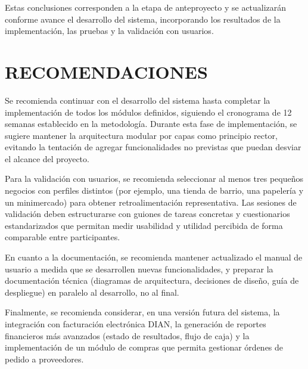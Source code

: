 \documentclass[spanish]{ieee_upb}
\begin{document}
Estas conclusiones corresponden a la etapa de anteproyecto y se actualizarán conforme avance el desarrollo del sistema, incorporando los resultados de la implementación, las pruebas y la validación con usuarios.



\newpage
\section*{RECOMENDACIONES}

Se recomienda continuar con el desarrollo del sistema hasta completar la implementación de todos los módulos definidos, siguiendo el cronograma de 12 semanas establecido en la metodología. Durante esta fase de implementación, se sugiere mantener la arquitectura modular por capas como principio rector, evitando la tentación de agregar funcionalidades no previstas que puedan desviar el alcance del proyecto.

Para la validación con usuarios, se recomienda seleccionar al menos tres pequeños negocios con perfiles distintos (por ejemplo, una tienda de barrio, una papelería y un minimercado) para obtener retroalimentación representativa. Las sesiones de validación deben estructurarse con guiones de tareas concretas y cuestionarios estandarizados que permitan medir usabilidad y utilidad percibida de forma comparable entre participantes.

En cuanto a la documentación, se recomienda mantener actualizado el manual de usuario a medida que se desarrollen nuevas funcionalidades, y preparar la documentación técnica (diagramas de arquitectura, decisiones de diseño, guía de despliegue) en paralelo al desarrollo, no al final.

Finalmente, se recomienda considerar, en una versión futura del sistema, la integración con facturación electrónica DIAN, la generación de reportes financieros más avanzados (estado de resultados, flujo de caja) y la implementación de un módulo de compras que permita gestionar órdenes de pedido a proveedores.

\newpage
\renewcommand\refname{REFERENCIAS}

\end{document}
